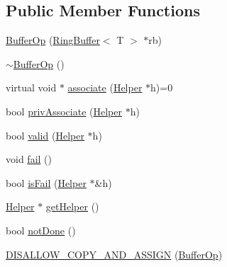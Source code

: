\subsection*{Public Member Functions}
\begin{DoxyCompactItemize}
\item 
\hyperlink{classtervel_1_1containers_1_1wf_1_1_ring_buffer_1_1_buffer_op_a3beeae0f911b913a997c4841392c577c}{Buffer\+Op} (\hyperlink{classtervel_1_1containers_1_1wf_1_1_ring_buffer}{Ring\+Buffer}$<$ T $>$ $\ast$rb)
\item 
\hyperlink{classtervel_1_1containers_1_1wf_1_1_ring_buffer_1_1_buffer_op_aed38cc45945b5fe9fa6020554ebe8543}{$\sim$\+Buffer\+Op} ()
\item 
virtual void $\ast$ \hyperlink{classtervel_1_1containers_1_1wf_1_1_ring_buffer_1_1_buffer_op_a345d7432fa98f44f1620f5f718ff7a1e}{associate} (\hyperlink{classtervel_1_1containers_1_1wf_1_1_ring_buffer_1_1_helper}{Helper} $\ast$h)=0
\item 
bool \hyperlink{classtervel_1_1containers_1_1wf_1_1_ring_buffer_1_1_buffer_op_a118e970ddcaef2f6e932244fc88d99e8}{priv\+Associate} (\hyperlink{classtervel_1_1containers_1_1wf_1_1_ring_buffer_1_1_helper}{Helper} $\ast$h)
\item 
bool \hyperlink{classtervel_1_1containers_1_1wf_1_1_ring_buffer_1_1_buffer_op_adb1f2fd8c3d16d7024c00d49124da0b5}{valid} (\hyperlink{classtervel_1_1containers_1_1wf_1_1_ring_buffer_1_1_helper}{Helper} $\ast$h)
\item 
void \hyperlink{classtervel_1_1containers_1_1wf_1_1_ring_buffer_1_1_buffer_op_a1afc3cef307a996571b654f41650dc4e}{fail} ()
\item 
bool \hyperlink{classtervel_1_1containers_1_1wf_1_1_ring_buffer_1_1_buffer_op_a90977eb87ba55abaabe0edb32ab609e7}{is\+Fail} (\hyperlink{classtervel_1_1containers_1_1wf_1_1_ring_buffer_1_1_helper}{Helper} $\ast$\&h)
\item 
\hyperlink{classtervel_1_1containers_1_1wf_1_1_ring_buffer_1_1_helper}{Helper} $\ast$ \hyperlink{classtervel_1_1containers_1_1wf_1_1_ring_buffer_1_1_buffer_op_ab67453c6a60a8cd47aefc9a5bece510a}{get\+Helper} ()
\item 
bool \hyperlink{classtervel_1_1containers_1_1wf_1_1_ring_buffer_1_1_buffer_op_a7b64b9df1ce447b38bbf6d874edea54d}{not\+Done} ()
\item 
\hyperlink{classtervel_1_1containers_1_1wf_1_1_ring_buffer_1_1_buffer_op_ac6f6c55dff8bae48cccce1357848d32f}{D\+I\+S\+A\+L\+L\+O\+W\+\_\+\+C\+O\+P\+Y\+\_\+\+A\+N\+D\+\_\+\+A\+S\+S\+I\+G\+N} (\hyperlink{classtervel_1_1containers_1_1wf_1_1_ring_buffer_1_1_buffer_op}{Buffer\+Op})
\end{DoxyCompactItemize}
